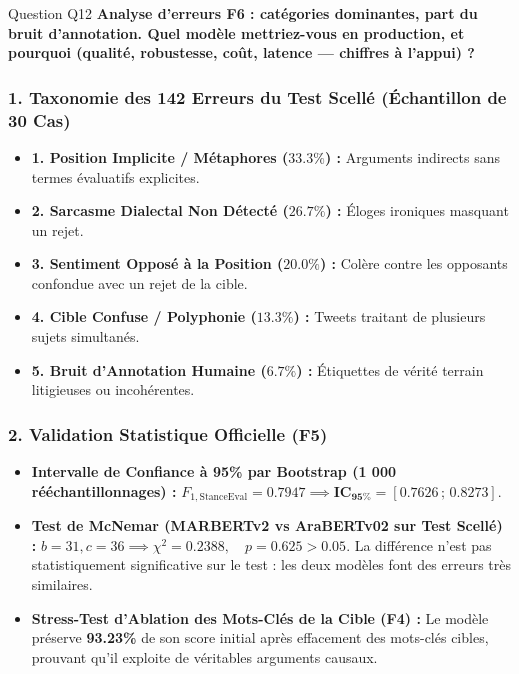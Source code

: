 \documentclass[11pt,a4paper]{article}
\begin{document}
\vspace{0.3cm}

\begin{questionbox}{Question Q12}
\textbf{Analyse d'erreurs F6 : catégories dominantes, part du bruit d'annotation. Quel modèle mettriez-vous en production, et pourquoi (qualité, robustesse, coût, latence — chiffres à l'appui) ?}
\end{questionbox}

\subsubsection*{1. Taxonomie des 142 Erreurs du Test Scellé (Échantillon de 30 Cas)}
\begin{itemize}[noitemsep]
    \item \textbf{1. Position Implicite / Métaphores ($33.3\%$) :} Arguments indirects sans termes évaluatifs explicites.
    \item \textbf{2. Sarcasme Dialectal Non Détecté ($26.7\%$) :} Éloges ironiques masquant un rejet.
    \item \textbf{3. Sentiment Opposé à la Position ($20.0\%$) :} Colère contre les opposants confondue avec un rejet de la cible.
    \item \textbf{4. Cible Confuse / Polyphonie ($13.3\%$) :} Tweets traitant de plusieurs sujets simultanés.
    \item \textbf{5. Bruit d'Annotation Humaine ($6.7\%$) :} Étiquettes de vérité terrain litigieuses ou incohérentes.
\end{itemize}

\subsubsection*{2. Validation Statistique Officielle (F5)}
\begin{itemize}[noitemsep]
    \item \textbf{Intervalle de Confiance à 95\% par Bootstrap (1 000 rééchantillonnages) :}  
    $F_{1,\text{StanceEval}} = 0.7947 \implies \mathbf{\text{IC}_{95\%} = [0.7626 \,;\, 0.8273]}$.
    \item \textbf{Test de McNemar (MARBERTv2 vs AraBERTv02 sur Test Scellé) :}  
    $b=31, c=36 \implies \chi^2 = 0.2388, \quad p = \mathbf{0.625} > 0.05$. La différence n'est pas statistiquement significative sur le test : les deux modèles font des erreurs très similaires.
    \item \textbf{Stress-Test d'Ablation des Mots-Clés de la Cible (F4) :} Le modèle préserve \textbf{93.23\%} de son score initial après effacement des mots-clés cibles, prouvant qu'il exploite de véritables arguments causaux.
\end{itemize}
\end{document}
